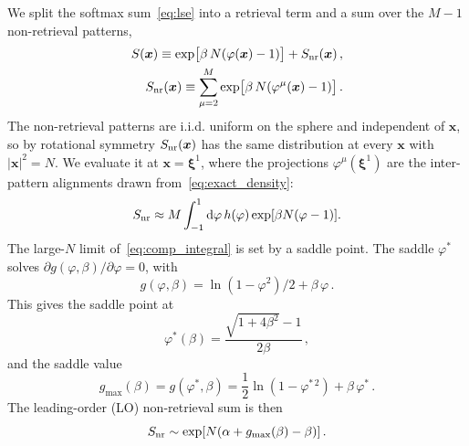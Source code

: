 \documentclass[letterpaper]{article} %
\newcommand{\bxi}{\boldsymbol{\xi}}
\newcommand{\bx}{\bm{x}}
\newcommand{\dd}{{\mathrm{d}}}
\newcommand{\Bnet}{\beta}
\newcommand{\p}{\partial}
\begin{document}
We split the softmax sum~\eqref{eq:lse} into a retrieval term and a sum over the $M-1$ non-retrieval patterns,
\begin{align}
S(\bx) \equiv \exp\!\big[\Bnet\,N (\varphi(\bx) - 1)\big] + S_{\rm nr}(\bx)\,,
\label{eq:softmax_sum}\\
S_{\rm nr}(\bx) \equiv \sum_{\mu=2}^{M} \exp\!\big[\Bnet\,N (\varphi^\mu(\bx) - 1)\big]\,.
\label{eq:comp_sum}
\end{align}
The non-retrieval patterns are i.i.d. uniform on the sphere and independent of $\bm x$, so by rotational symmetry $S_{\rm nr}(\bm x)$ has the same distribution at every $\bm x$ with $|\bm x|^2 = N$. We evaluate it at $\bm x = \bxi^1$, where the projections $\varphi^\mu(\bxi^1)$ are the inter-pattern alignments drawn from~\eqref{eq:exact_density}:
\begin{equation}
    S_{\rm nr} \approx M \int_{-1}^{1} \dd\varphi\, h(\varphi) \exp[\Bnet N(\varphi - 1)].
    \label{eq:comp_integral}
\end{equation}
The large-$N$ limit of~\eqref{eq:comp_integral} is set by a saddle point. The
saddle $\varphi^*$ solves $\p g(\varphi, \Bnet)/\p\varphi = 0$, with
\begin{equation}
    g(\varphi, \Bnet) = \ln(1-\varphi^2)/2 + \Bnet\,\varphi\,.
\end{equation}
This gives the saddle point at
\begin{equation}
\varphi^*(\Bnet) = \frac{\sqrt{1+4\Bnet^2} - 1}{2\Bnet}\,,
\label{eq:saddle}
\end{equation}
and the saddle value
\begin{equation}
g_{\max}(\Bnet) = g(\varphi^*, \Bnet) = \frac12 \ln(1 - \varphi^{*\,2}) + \Bnet\,\varphi^*\,.
\label{eq:saddle_value}
\end{equation}
The leading-order (LO) non-retrieval sum is then
\begin{equation}
    S_{\rm nr} \sim \exp[N(\alpha + g_{\max}(\Bnet) - \Bnet)]\,.
    \label{eq:comp_saddle}
\end{equation}
\end{document}
